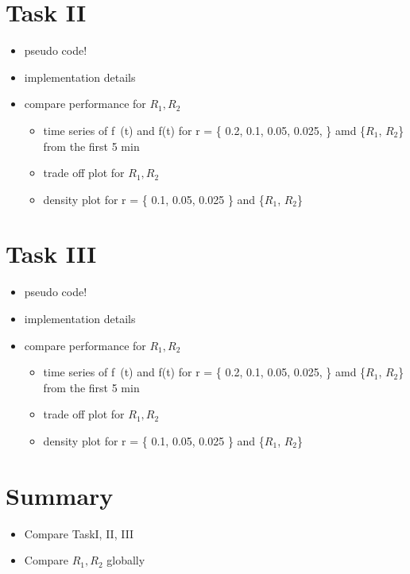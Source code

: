 \documentclass[a4paper, smallheadings,english]{scrartcl}
\begin{document}
\section{Task II}
\begin{itemize}
    \item pseudo code!
    \item implementation details
    \item compare performance for $R_1, R_2$
    \begin{itemize}
        \item time series of f~(t) and f(t) for r = \{ 0.2, 0.1, 0.05, 0.025, \} amd \{$R_1$, $R_2$\} from the first 5 min
        \item trade off plot for $R_1, R_2$
        \item density plot for r = \{ 0.1, 0.05, 0.025 \} and \{$R_1$, $R_2$\}
    \end{itemize}
\end{itemize}

\section{Task III}
\begin{itemize}
    \item pseudo code!
    \item implementation details
    \item compare performance for $R_1, R_2$
    \begin{itemize}
        \item time series of f~(t) and f(t) for r = \{ 0.2, 0.1, 0.05, 0.025, \} amd \{$R_1$, $R_2$\} from the first 5 min
        \item trade off plot for $R_1, R_2$
        \item density plot for r = \{ 0.1, 0.05, 0.025 \} and \{$R_1$, $R_2$\}
    \end{itemize}
\end{itemize}

\section{Summary}
\begin{itemize}
    \item Compare TaskI, II, III
    \item Compare $R_1, R_2$ globally
\end{itemize}


\end{document}
